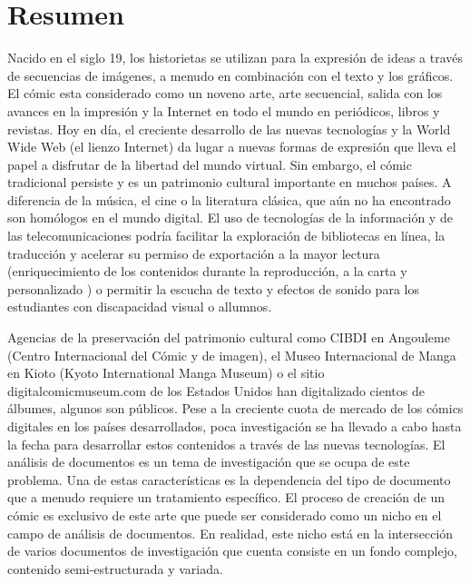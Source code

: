 \chapter*{Resumen}

Nacido en el siglo 19, los historietas se utilizan para la expresión de ideas a través de secuencias de imágenes, a menudo en combinación con el texto y los gráficos.
El cómic esta considerado como un noveno arte, arte secuencial, salida con los avances en la impresión y la Internet en todo el mundo en periódicos, libros y revistas.
Hoy en día, el creciente desarrollo de las nuevas tecnologías y la World Wide Web (el lienzo Internet) da lugar a nuevas formas de expresión que lleva el papel a disfrutar de la libertad del mundo virtual.
Sin embargo, el cómic tradicional persiste y es un patrimonio cultural importante en muchos países.
A diferencia de la música, el cine o la literatura clásica, que aún no ha encontrado son homólogos en el mundo digital.
El uso de tecnologías de la información y de las telecomunicaciones podría facilitar la exploración de bibliotecas en línea, la traducción y acelerar su permiso de exportación a la mayor lectura (enriquecimiento de los contenidos durante la reproducción, a la carta y personalizado ) o permitir la escucha de texto y efectos de sonido para los estudiantes con discapacidad visual o allumnos.

Agencias de la preservación del patrimonio cultural como CIBDI en Angouleme (Centro Internacional del Cómic y de imagen), el Museo Internacional de Manga en Kioto (Kyoto International Manga Museum) o el sitio digitalcomicmuseum.com de los Estados Unidos han digitalizado cientos de álbumes, algunos son públicos.
Pese a la creciente cuota de mercado de los cómics digitales en los países desarrollados, poca investigación se ha llevado a cabo hasta la fecha para desarrollar estos contenidos a través de las nuevas tecnologías.
El análisis de documentos es un tema de investigación que se ocupa de este problema. Una de estas características es la dependencia del tipo de documento que a menudo requiere un tratamiento específico.
El proceso de creación de un cómic es exclusivo de este arte que puede ser considerado como un nicho en el campo de análisis de documentos.
En realidad, este nicho está en la intersección de varios documentos de investigación que cuenta consiste en un fondo complejo, contenido semi-estructurada y variada.

